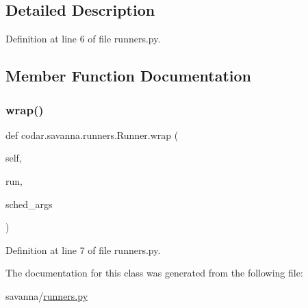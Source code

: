 \subsection{Detailed Description}


Definition at line 6 of file runners.\+py.



\subsection{Member Function Documentation}
\mbox{\label{classcodar_1_1savanna_1_1runners_1_1_runner_a7e8a83cd991c604a5238af27bdc6e013}} 
\subsubsection{\texorpdfstring{wrap()}{wrap()}}
{\footnotesize\ttfamily def codar.\+savanna.\+runners.\+Runner.\+wrap (\begin{DoxyParamCaption}\item[{}]{self,  }\item[{}]{run,  }\item[{}]{sched\+\_\+args }\end{DoxyParamCaption})}



Definition at line 7 of file runners.\+py.



The documentation for this class was generated from the following file\+:\begin{DoxyCompactItemize}
\item 
savanna/\hyperlink{savanna_2runners_8py}{runners.\+py}\end{DoxyCompactItemize}
